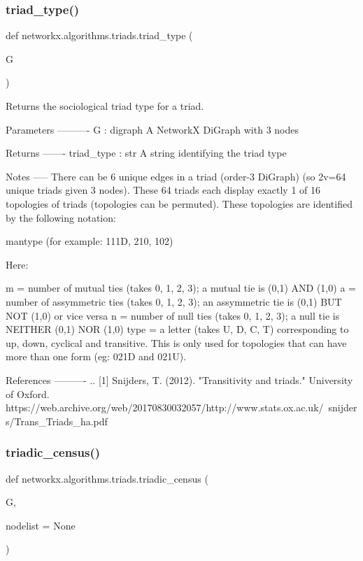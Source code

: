 \subsubsection{\texorpdfstring{triad\+\_\+type()}{triad\_type()}}
{\footnotesize\ttfamily def networkx.\+algorithms.\+triads.\+triad\+\_\+type (\begin{DoxyParamCaption}\item[{}]{G }\end{DoxyParamCaption})}

\begin{DoxyVerb}Returns the sociological triad type for a triad.

Parameters
----------
G : digraph
   A NetworkX DiGraph with 3 nodes

Returns
-------
triad_type : str
   A string identifying the triad type

Notes
-----
There can be 6 unique edges in a triad (order-3 DiGraph) (so 2^^6=64 unique
triads given 3 nodes). These 64 triads each display exactly 1 of 16
topologies of triads (topologies can be permuted). These topologies are
identified by the following notation:

{m}{a}{n}{type} (for example: 111D, 210, 102)

Here:

{m}     = number of mutual ties (takes 0, 1, 2, 3); a mutual tie is (0,1)
          AND (1,0)
{a}     = number of assymmetric ties (takes 0, 1, 2, 3); an assymmetric tie
          is (0,1) BUT NOT (1,0) or vice versa
{n}     = number of null ties (takes 0, 1, 2, 3); a null tie is NEITHER
          (0,1) NOR (1,0)
{type}  = a letter (takes U, D, C, T) corresponding to up, down, cyclical
          and transitive. This is only used for topologies that can have
          more than one form (eg: 021D and 021U).

References
----------
.. [1] Snijders, T. (2012). "Transitivity and triads." University of
    Oxford.
    https://web.archive.org/web/20170830032057/http://www.stats.ox.ac.uk/~snijders/Trans_Triads_ha.pdf
\end{DoxyVerb}
 \mbox{\label{namespacenetworkx_1_1algorithms_1_1triads_af7fe7f5b5c6cf60ccc70b1013322e44f}} 
\subsubsection{\texorpdfstring{triadic\+\_\+census()}{triadic\_census()}}
{\footnotesize\ttfamily def networkx.\+algorithms.\+triads.\+triadic\+\_\+census (\begin{DoxyParamCaption}\item[{}]{G,  }\item[{}]{nodelist = {\ttfamily None} }\end{DoxyParamCaption})}

